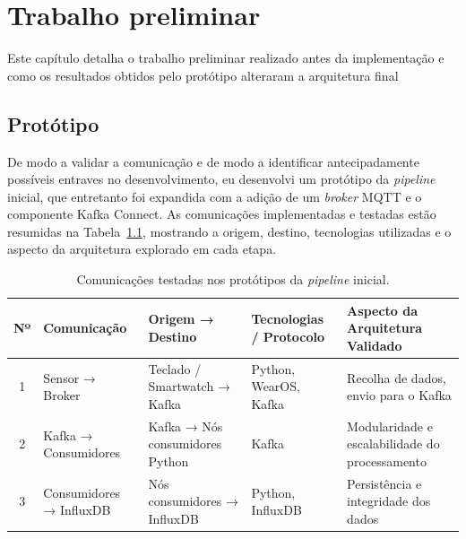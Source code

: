 \chapter{Trabalho preliminar}
\label{chap:preliminar}

\begin{introduction}
Este capítulo detalha o trabalho preliminar realizado antes da implementação e como os resultados obtidos pelo protótipo alteraram a arquitetura final
\end{introduction}


\section{Protótipo}
\label{sec:prototype}

De modo a validar a comunicação e de modo a identificar antecipadamente possíveis entraves no desenvolvimento, eu desenvolvi um protótipo da \textit{pipeline} inicial, que entretanto foi expandida com a adição de um \textit{broker} \ac{MQTT} e o componente Kafka Connect.
As comunicações implementadas e testadas estão resumidas na Tabela~\ref{tab:comunicacoes-prototipo}, mostrando a origem, destino, tecnologias utilizadas e o aspecto da arquitetura explorado em cada etapa.

\begin{table}[H]
    \centering
    \caption{Comunicações testadas nos protótipos da \textit{pipeline} inicial.}
    \label{tab:comunicacoes-prototipo}
    \begin{tabularx}{\textwidth}{c|l|X|l|X}
        \hline
        Nº & Comunicação & Origem → Destino & Tecnologias / Protocolo & Aspecto da Arquitetura Validado \\
        \hline
        1 & Sensor → Broker & Teclado / Smartwatch → Kafka & Python, WearOS, Kafka & Recolha de dados, envio para o Kafka \\
        2 & Kafka → Consumidores~\footnotemark & Kafka → Nós consumidores Python & Kafka & Modularidade e escalabilidade do processamento \\
        3 & Consumidores → InfluxDB & Nós consumidores → InfluxDB & Python, InfluxDB & Persistência e integridade dos dados \\
        \hline
    \end{tabularx}
\end{table}


